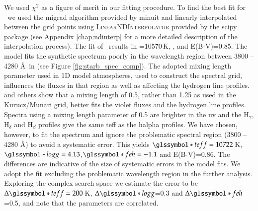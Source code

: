 We used $\chi^2$ as a figure of merit in our fitting procedure. To find the best fit for \starb\ we used the \gls{migrad} algorithm provided by \gls{minuit} and linearly interpolated between the grid points using \textsc{LinearNDInterpolator} provided by the \gls{scipy} package (see Appendix \ref{chap:ndinterp} for a more detailed description of the interpolation process). The fit of \starb\ results in =10570\,\textrm{K}, ,  and E(B-V)=0.85. The model fits the synthetic spectrum poorly  in the wavelength region between 3800 -- 4280 \AA\ in (see Figure \ref{fig:starb_spec_comp}). The adopted mixing length parameter used in 1D model atmospheres, used to construct the spectral grid, influences the fluxes in that region as well as affecting the hydrogen line profiles. \citet{2002A&A...392..619H} and others show that a mixing length of 0.5, rather than 1.25 as used in the Kurucz/Munari grid, better fits the violet fluxes and the hydrogen line profiles. Spectra using a mixing length parameter of 0.5 are brighter in the \gls{uv} and the $\textrm{H}_\gamma$, $\textrm{H}_\delta$ and $\textrm{H}_\beta$ profiles give the same \gls{teff} as the \gls{halpha} profiles. We have chosen, however, to fit the spectrum and ignore the problematic spectral region (3800 -- 4280 \AA) to avoid a systematic error. This yields $\teff=10722$\,K, $\logg=4.13$,$ \feh=-1.1$ and E(B-V)=0.86. The differences are indicative of the size of systematic errors in the model fits. We adopt the fit excluding the problematic wavelength region in the further analysis. Exploring the complex search space we estimate the error to be $\Delta\teff=200$\,K, $\Delta\logg$=0.3 and $\Delta\feh$=0.5, and note that the parameters are correlated.  

